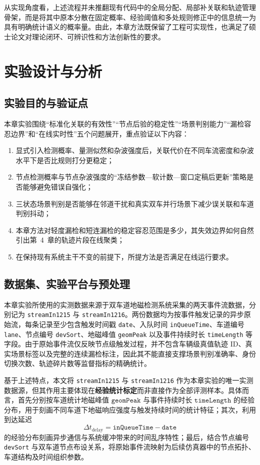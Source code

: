 \documentclass{xdupgthesis}
\begin{document}
从实现角度看，上述流程并未推翻现有代码中的全局分配、局部补关联和轨迹管理骨架，而是将其中原本分散在固定概率、经验阈值和多处规则修正中的信息统一为具有明确统计语义的概率量。由此，本章方法既保留了工程可实现性，也满足了硕士论文对理论闭环、可辨识性和方法创新性的要求。

\section{实验设计与分析}
\label{sec:ch3_experiment}

\subsection{实验目的与验证点}

本章实验围绕“标准化关联的有效性”“节点后验的稳定性”“场景判别能力”“漏检容忍边界”和“在线实时性”五个问题展开，重点验证以下内容：
\begin{enumerate}
	\item 显式引入检测概率、量测似然和杂波强度后，关联代价在不同车流密度和杂波水平下是否比规则打分更稳定；
	\item 节点检测概率与节点杂波强度的“冻结参数—软计数—窗口定稿后更新”策略是否能够避免错误自强化；
	\item 三状态场景判别是否能够在邻道干扰和真实双车并行场景下减少误关联和车道判别抖动；
	\item 本章方法对轻度漏检和短连漏检的稳定容忍范围是多少，其失效边界如何自然引出第~4~章的轨迹片段在线聚类；
	\item 在保持现有系统主干不变的前提下，所提方法是否满足在线运行要求。
\end{enumerate}

\subsection{数据集、实验平台与预处理}

本章实验所使用的实测数据来源于双车道地磁检测系统采集的两天事件流数据，分别记为 \texttt{streamIn1215} 与 \texttt{streamIn1216}。两份数据均为按事件触发记录的异步原始流，每条记录至少包含触发时间戳 \texttt{date}、入队时间 \texttt{inQueueTime}、车道编号 \texttt{lane}、节点编号 \texttt{devSort}、地磁峰值 \texttt{geomPeak} 以及事件持续时长 \texttt{timeLength} 等字段。由于原始事件流仅反映节点级触发过程，并不包含车辆级真值轨迹 ID、真实场景标签以及完整的连续漏检标注，因此其不能直接支撑场景判别准确率、身份切换次数、轨迹碎片数等监督指标的精确统计。

基于上述特点，本文将 \texttt{streamIn1215} 与 \texttt{streamIn1216} 作为本章实验的唯一实测数据源，但其作用主要体现在\textbf{经验统计标定}而非直接作为全部评测样本。具体而言，首先分别按车道统计地磁峰值 $\texttt{geomPeak}$ 与事件持续时长 $\texttt{timeLength}$ 的经验分布，用于刻画不同车道下地磁响应强度与触发持续时间的统计特征；其次，利用到达延迟
\[
\Delta t_{\mathrm{delay}}=\texttt{inQueueTime}-\texttt{date}
\]
的经验分布刻画异步通信与系统缓冲带来的时间乱序特性；最后，结合节点编号 \texttt{devSort} 与双车道节点布设关系，将原始事件流映射为后续仿真器中的节点拓扑、车道结构及时间组织参数。
\end{document}
